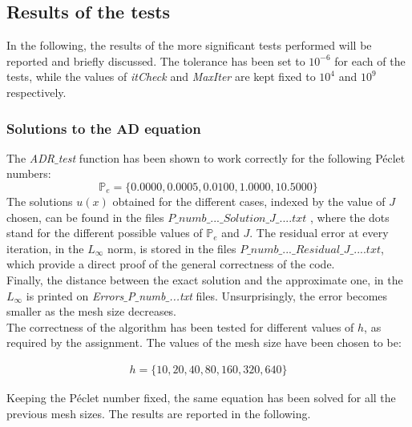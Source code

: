 \documentclass[11pt]{article}
\theoremstyle{theorem}
\theoremstyle{definition}
\begin{document}
\subsection{Results of the tests}
In the following, the results of the more significant tests performed will be reported and briefly discussed. The tolerance has been set to $10^{-6}$ for each of the tests, while the values of \emph{itCheck} and \emph{MaxIter} are kept fixed to $10^4$ and $10^9$ respectively.\\

\subsubsection{Solutions to the AD equation}
The \emph{ADR$\_$test} function has been shown to work correctly for the following  P\'{e}clet numbers:
$$\mathbb{P}_e=\lbrace 0.0000, 0.0005, 0.0100, 1.0000, 10.5000 \rbrace$$
The solutions $u(x)$ obtained for the different cases, indexed by the value of $J$ chosen, can be found in the files $P\_numb\_...\_Solution\_J\_....txt$ , where the dots stand for the different possible values of $\mathbb{P}_e$ and $J$. The residual error at every iteration, in the $L_\infty$ norm, is stored in the files $P\_numb\_...\_Residual\_J\_....txt$, which provide a direct proof of the general correctness of the code.\\
Finally, the distance between the exact solution and the approximate one, in the $L_\infty$ is printed on \emph{Errors$\_$P$\_$numb$\_$...txt} files. Unsurprisingly, the error becomes smaller as the mesh size decreases.\\
The correctness of the algorithm has been tested for different values of $h$, as required by the assignment. The values of the mesh size have been chosen to be:

\begin{align}
	\label{eqn:h-choice}
	h=\lbrace10, 20, 40, 80, 160, 320, 640\rbrace
\end{align}

Keeping the P\'{e}clet number fixed, the same equation has been solved for all the previous mesh sizes. The results are reported in the following.\\
\end{document}
